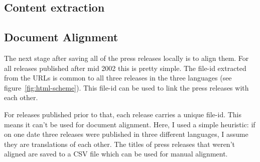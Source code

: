 \subsection{Content extraction}


\subsection{Document Alignment}
The next stage after saving all of the press releases locally is to align them. 
For all releases published after mid 2002 this is pretty simple. 
The file-id extracted from the URLs is common to all three releases in the three languages (see figure~\ref{fig:html-scheme}). 
This file-id can be used to link the press releases with each other.

For releases published prior to that, each release carries a unique file-id. 
This means it can't be used for document alignment. 
Here, I used a simple heuristic: if on one date three releases were published in three different languages, I assume they are translations of each other. 
The titles of press releases that weren't aligned are saved to a CSV file which can be used for manual alignment.


